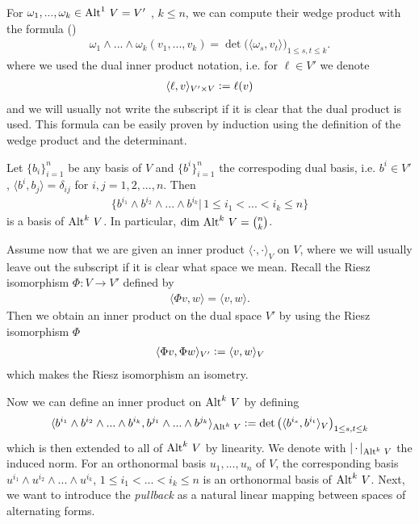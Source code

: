 \documentclass[../master_thesis.tex]{subfiles}
\begin{document}
For $\omega_1,...,\omega_k \in {\operatorname{Alt}^{1}\,V} = V'$
, $k \leq n$, we can compute their wedge product with the formula (\cite[p.260]{topology_and_geometry})
\begin{align}
    \omega_1 \wedge ... \wedge \omega_k (v_1,...,v_k)
    = \det \big( \langle \omega_s, v_t \rangle \big)_{1\leq s,t \leq k}. 
    \label{eq:wedge_product_of_one_forms}
\end{align}
where we used the dual inner product notation, i.e. for $\ell \in V'$ we denote 
\begin{align*}
    \langle \ell, v \rangle_{V' \times V} \vcentcolon= \ell (v)
\end{align*}
and we will usually not write the subscript if it is clear that the dual product is used.
This formula can be easily proven by induction using the definition of the 
wedge product and the determinant.

Let $\{ b_i\}_{i=1}^n$ be any basis of $V$ and $\{ b^i\}_{i=1}^n$ the 
correspoding dual basis, i.e. 
$b^i \in V'$, $\langle b^i, b_j \rangle = \delta_{ij}$ for $i,j = 1,2,..., n$. Then 
\begin{align*}
    \{b^{i_1} \wedge b^{i_2} \wedge ... \wedge b^{i_k} | \, 
    1 \leq i_1 < ... < i_k \leq n \}
\end{align*}
is a basis of ${\operatorname{Alt}^{k}\,V}$. In particular, 
$\dim\, {\operatorname{Alt}^{k}\,V} = \binom{n}{k}$.

Assume now that we are given an inner product $\langle \cdot, \cdot \rangle_V$ on $V$, 
where we will usually leave out the 
subscript if it is clear what space we mean.
Recall the Riesz isomorphism $\Phi: V \rightarrow V'$ defined by
\begin{align*}
   \langle \Phi v, w \rangle = \langle v, w \rangle.
\end{align*}
Then we obtain an inner 
product on the dual space $V'$ by using the Riesz isomorphism $\Phi$ 
\begin{align*}
    \langle \Phi v, \Phi w \rangle_{V'} \vcentcolon= \langle v, w \rangle_V
\end{align*}
which makes the Riesz isomorphism an isometry.

Now we can define an inner product on ${\operatorname{Alt}^{k}\,V}$ by defining
\begin{align}
    \langle b^{i_1} \wedge b^{i_2} \wedge... \wedge b^{i_k}, 
    b^{j_1} \wedge... \wedge b^{j_k} \rangle_{{\operatorname{Alt}^{k}\,V}} 
    \vcentcolon= \det  \big( \langle b^{i_s}, b^{i_t} \rangle_V \big)_
    {1\leq s,t \leq k} \label{eq:inner_product_alternating_forms}
\end{align}
which is then extended to all of ${\operatorname{Alt}^{k}\,V}$ by linearity. 
We denote with $\lvert \, \cdot\, \rvert _{\operatorname{Alt}^{k}\,V}$ the induced norm.
For an orthonormal basis 
$u_1,...,u_n$ of $V$, the corresponding basis 
$u^{i_1} \wedge u^{i_2} \wedge ... \wedge u^{i_k}$, 
$1\leq i_1 < ... < i_k \leq n$ is an orthonormal basis of ${\operatorname{Alt}^{k}\,V}$.
Next, we want to introduce the \textit{pullback} as a natural linear
mapping between spaces of alternating forms. 
\end{document}
